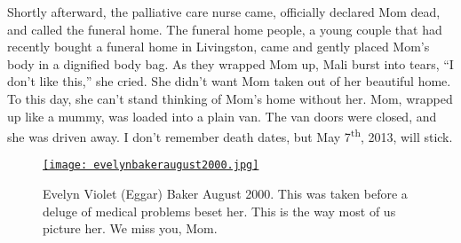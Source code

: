 Shortly afterward, the palliative care nurse came, officially declared
Mom dead, and called the funeral home. The funeral home people, a young
couple that had recently bought a funeral home in Livingston, came and
gently placed Mom's body in a dignified body bag. As they wrapped Mom
up, Mali burst into tears, ``I don't like this,'' she cried. She didn't
want Mom taken out of her beautiful home. To this day, she can't stand
thinking of Mom's home without her. Mom, wrapped up like a mummy, was
loaded into a plain van. The van doors were closed, and she was driven
away. I don't remember death dates, but May 7\textsuperscript{th}, 2013,
will stick.

%

\begin{SCfigure}[50]
\centering
\href{https://conceptcontrol.smugmug.com/People/The-Way-We-Were/i-HwPZXV9/A}{\texttt{[image: evelynbakeraugust2000.jpg]}}
\caption[Evelyn Violet (Eggar) Baker August 2000]{Evelyn Violet (Eggar) Baker August 2000. This was taken before a
deluge of medical problems beset her. This is the way most of us picture
her. We miss you, Mom.}
\label{fig:8149x1}
\end{SCfigure}

%


%
 


